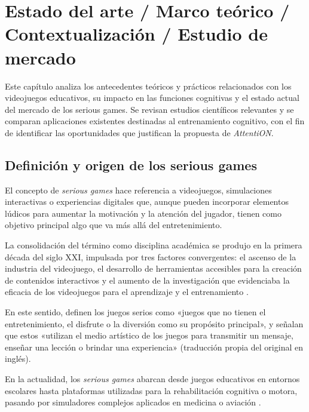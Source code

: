 \documentclass[12pt, a4paper]{report}
\begin{document}
\chapter{Estado del arte / Marco teórico / Contextualización / Estudio de mercado}

Este capítulo analiza los antecedentes teóricos y prácticos relacionados con
los videojuegos educativos, su impacto en las funciones cognitivas y el estado
actual del mercado de los serious games. Se revisan estudios científicos
relevantes y se comparan aplicaciones existentes destinadas al entrenamiento
cognitivo, con el fin de identificar las oportunidades que justifican la
propuesta de \textit{AttentiON}.

\section{Definición y origen de los serious games}

El concepto de \textit{serious games} hace referencia a videojuegos, simulaciones
interactivas o experiencias digitales que, aunque pueden incorporar elementos
lúdicos para aumentar la motivación y la atención del jugador, tienen como
objetivo principal algo que va más allá del entretenimiento.

La consolidación del término como disciplina académica se produjo en la primera
década del siglo XXI, impulsada por tres factores convergentes: el ascenso de la
industria del videojuego, el desarrollo de herramientas accesibles para la creación
de contenidos interactivos y el aumento de la investigación que evidenciaba la
eficacia de los videojuegos para el aprendizaje y el entrenamiento
\citep{Michael2006}.

En este sentido, \citet{Michael2006} definen los juegos serios como
«juegos que no tienen el entretenimiento, el disfrute o la diversión como
su propósito principal», y señalan que estos «utilizan el medio artístico de
los juegos para transmitir un mensaje, enseñar una lección o brindar una
experiencia» (traducción propia del original en inglés).

En la actualidad, los \textit{serious games} abarcan desde juegos educativos
en entornos escolares hasta plataformas utilizadas para la rehabilitación
cognitiva o motora, pasando por simuladores complejos aplicados en medicina
o aviación \citep{GamesForChange}.
\end{document}
